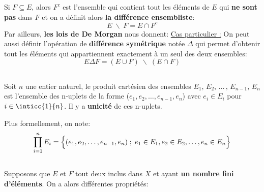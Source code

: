 Si \(F \subseteq E\), alors \(F^c\) est l'ensemble qui contient tout les éléments de \(E\) qui \textbf{ne sont pas} dans \(F\) et on a définit alors \textbf{la différence ensembliste}:
\[
   E \;\backslash\; F = E \cap F^c  
\]
Par ailleurs, \textbf{les lois de De Morgan} nous donnent:
\underline{Cas particulier {:}}
On peut aussi définir l'opération de \textbf{différence symétrique} notée \(\Delta\) qui permet d'obtenir tout les éléments qui appartiennent exactement à un seul des deux ensembles:
\[
   E \Delta F = (E \cup F) \;\backslash\; (E \cap F)   
\]

\subsection*{}

Soit \(n\) une entier naturel, le produit cartésien des ensembles \(E_1,\, E_2,\, \ldots\,,\, E_{n-1},\, E_n\) est l'ensemble des n-uplets de la forme (\(e_1, e_2, \ldots, e_{n-1}, e_n\)) avec \(e_i \in E_i\) pour \(i \in \inticc{1}{n}\).
Il y a \textbf{unicité} de ces n-uplets.

Plus formellement, on note:
\[
     \prod_{i=1}^{n} E_i = \Bigl\{ (e_1, e_2, \ldots, e_{n-1}, e_n) \; ; \; e_1 \in E_1, e_2 \in E_2, \ldots,  e_n \in E_n \Bigl\}
\]
\pagebreak

\subsection*{}

Supposons que \(E\) et \(F\) tout deux inclus dans \(X\) et ayant \textbf{un nombre fini d'éléments}. On a alors différentes propriétés:
\subsection*{}

